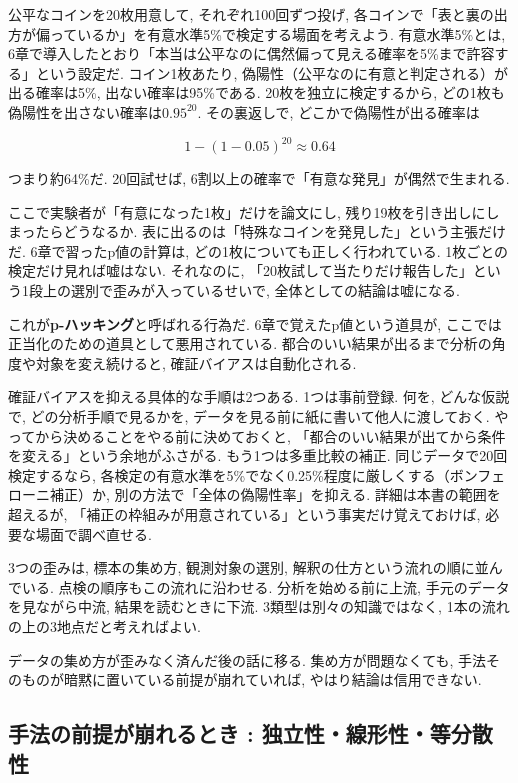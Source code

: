 公平なコインを20枚用意して, それぞれ100回ずつ投げ, 各コインで「表と裏の出方が偏っているか」を有意水準5\%で検定する場面を考えよう.
有意水準5\%とは, 6章で導入したとおり「本当は公平なのに偶然偏って見える確率を5\%まで許容する」という設定だ.
コイン1枚あたり, 偽陽性（公平なのに有意と判定される）が出る確率は5\%, 出ない確率は95\%である.
20枚を独立に検定するから, どの1枚も偽陽性を出さない確率は$0.95^{20}$. その裏返しで, どこかで偽陽性が出る確率は

$$
1 - (1 - 0.05)^{20} \approx 0.64
$$

つまり約64\%だ. 20回試せば, 6割以上の確率で「有意な発見」が偶然で生まれる.

ここで実験者が「有意になった1枚」だけを論文にし, 残り19枚を引き出しにしまったらどうなるか.
表に出るのは「特殊なコインを発見した」という主張だけだ.
6章で習ったp値の計算は, どの1枚についても正しく行われている.
1枚ごとの検定だけ見れば嘘はない.
それなのに, 「20枚試して当たりだけ報告した」という1段上の選別で歪みが入っているせいで, 全体としての結論は嘘になる.

これが\textbf{p-ハッキング}と呼ばれる行為だ.
6章で覚えたp値という道具が, ここでは正当化のための道具として悪用されている.
都合のいい結果が出るまで分析の角度や対象を変え続けると, 確証バイアスは自動化される.

確証バイアスを抑える具体的な手順は2つある.
1つは事前登録. 何を, どんな仮説で, どの分析手順で見るかを, データを見る前に紙に書いて他人に渡しておく.
やってから決めることをやる前に決めておくと, 「都合のいい結果が出てから条件を変える」という余地がふさがる.
もう1つは多重比較の補正. 同じデータで20回検定するなら, 各検定の有意水準を5\%でなく0.25\%程度に厳しくする（ボンフェローニ補正）か, 別の方法で「全体の偽陽性率」を抑える.
詳細は本書の範囲を超えるが, 「補正の枠組みが用意されている」という事実だけ覚えておけば, 必要な場面で調べ直せる.

3つの歪みは, 標本の集め方, 観測対象の選別, 解釈の仕方という流れの順に並んでいる. 点検の順序もこの流れに沿わせる.
分析を始める前に上流, 手元のデータを見ながら中流, 結果を読むときに下流.
3類型は別々の知識ではなく, 1本の流れの上の3地点だと考えればよい.

データの集め方が歪みなく済んだ後の話に移る. 集め方が問題なくても, 手法そのものが暗黙に置いている前提が崩れていれば, やはり結論は信用できない.


\subsection{手法の前提が崩れるとき : 独立性・線形性・等分散性}

